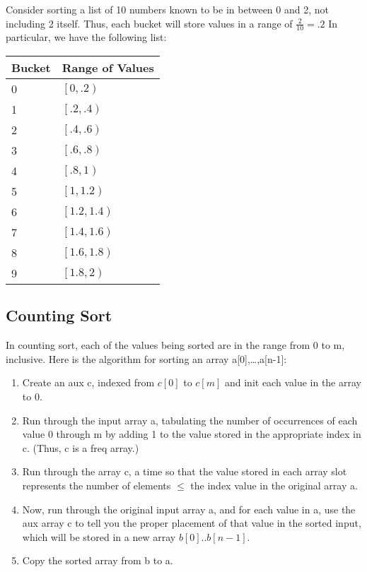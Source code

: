 Consider sorting a list of 10 numbers known to be in between 0 and 2, not including 2 itself. Thus, each bucket will store values in a range of $\frac{2}{10}=.2$ In particular, we have the following list:

\begin{tabularx}{\linewidth}{XX}
    Bucket & Range of Values\\
    \toprule
    0 & $\left[0,.2\right)$ \\
    1 & $\left[.2,.4\right)$ \\
    2 & $\left[.4,.6\right)$ \\
    3 & $\left[.6,.8\right)$ \\
    4 & $\left[.8,1\right)$ \\
    5 & $\left[1,1.2\right)$ \\
    6 & $\left[1.2,1.4\right)$ \\
    7 & $\left[1.4,1.6\right)$ \\
    8 & $\left[1.6,1.8\right)$ \\
    9 & $\left[1.8,2\right)$
\end{tabularx}

\subsection*{Counting Sort}

In counting sort, each of the values being sorted are in the range from 0 to m, inclusive.
Here is the algorithm for sorting an array a[0],\dots,a[n-1]:

\begin{enumerate}
    \item Create an aux c, indexed from $c[0]$ to $c[m]$ and init each value in the array to 0.
    \item Run through the input array a, tabulating the number of occurrences of each
        value 0 through m by adding 1 to the value stored in the appropriate index in c.
        (Thus, c is a freq array.)
    \item Run through the array c, a  time so that the value stored in each
        array slot represents the number of elements $\le$ the index value in the
        original array a.
    \item Now, run through the original input array a, and for each value in a, use
        the aux array c to tell you the proper placement of that value in the sorted
        input, which will be stored in a new array $b[0]..b[n-1]$.
    \item Copy the sorted array from b to a.
\end{enumerate}

